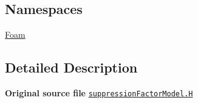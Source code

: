 \subsection*{Namespaces}
\begin{DoxyCompactItemize}
\item 
 \hyperlink{namespaceFoam}{Foam}
\end{DoxyCompactItemize}


\subsection{Detailed Description}
{\bfseries Original source file} \href{../../../home/carlo/data/GeN-Foam/GeN-Foam_ffn/GeN-Foam/GeN-Foam/classes/thermalHydraulics/src/physicsModels/heatTransferModels/FSHeatTransferCoefficientModels/subModels/suppressionFactorModels/suppressionFactorModel.H}{\tt suppression\+Factor\+Model.\+H} 
